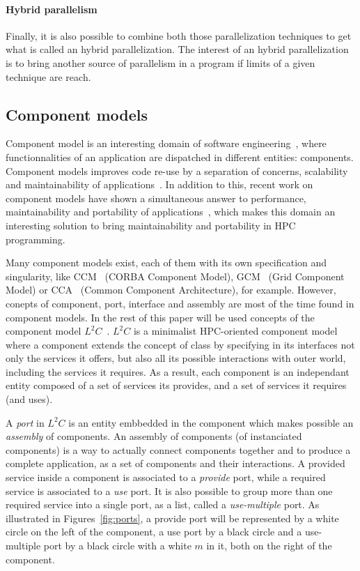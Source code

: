 \paragraph{Hybrid parallelism} Finally, it is also possible to combine both those parallelization techniques to get what is called an hybrid parallelization. The interest of an hybrid parallelization is to bring another source of parallelism in a program if limits of a given technique are reach.

\subsection{Component models}
Component model is an interesting domain of software engineering~\cite{Szyperski:2002:CSB:515228}, where functionnalities of an application are dispatched in different entities: components. Component models improves code re-use by a separation of concerns, scalability and maintainability of applications~\cite{Szyperski:2002:CSB:515228,bigot:inria-00388508}. In addition to this, recent work on component models have shown a simultaneous answer to performance, maintainability and portability of applications~\cite{l2c}, which makes this domain an interesting solution to bring maintainability and portability in HPC programming.

Many component models exist, each of them with its own specification and singularity, like CCM~\cite{corba:omg06} (CORBA Component Model), GCM~\cite{Baude} (Grid Component Model) or CCA~\cite{Armstrong:1999:TCC:822084.823232} (Common Component Architecture), for example. However, conepts of component, port, interface and assembly are most of the time found in component models. In the rest of this paper will be used concepts of the component model $L^2C$~\cite{l2c}. $L^2C$ is a minimalist HPC-oriented component model where a component extends the concept of class by specifying in its interfaces not only the services it offers, but also all its possible interactions with outer world, including the services it requires. As a result, each component is an independant entity composed of a set of services its provides, and a set of services it requires (and uses). 

A \emph{port} in $L^2C$ is an entity embbedded in the component which makes possible an \emph{assembly} of components. An assembly of components (of instanciated components) is a way to actually connect components together and to produce a complete application, as a set of components and their interactions. A provided service inside a component is associated to a \emph{provide} port, while a required service is associated to a \emph{use} port. It is also possible to group more than one required service into a single port, as a list, called a \emph{use-multiple} port. As illustrated in Figures~\ref{fig:ports}, a provide port will be represented by a white circle on the left of the component, a use port by a black circle and a use-multiple port by a black circle with a white $m$ in it, both on the right of the component.

